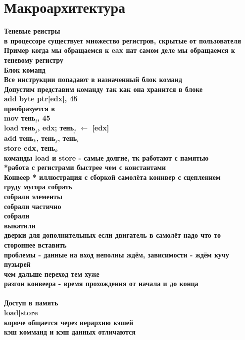 \documentclass[a4paper, 12pt]{article}
\begin{document}
\section*{Макроархитектура}
\hypertarget{macroarch}{}
\bf{Теневые реистры} \\
в процессоре существует множество регистров, скрытые от пользователя \\
Пример когда мы обращаемся к eax нат самом деле мы обращаемся к теневому регистру\\
\bf{Блок команд} \\
Все инструкции попадают в назначенный блок команд \\
Допустим представим команду так как она хранится в блоке \\
add byte ptr[edx], 45 \\
преобразуется в \\
mov тень$_i$, 45 \\
load тень$_j$, edx; тень$_j$ $\leftarrow$ [edx] \\
add тень$_k$, тень$_j$, тень$_i$ \\
store edx, тень$_k$ \\
команды load и store - самые долгие, тк работают с памятью \\
*работа с регистрами быстрее чем с константами \\
\bf{Конвеер}
* иллюстрация с сборкой самолёта коннвер с сцеплением \\
груду мусора собрать \\
собрали элементы \\
собрали частично \\
собрали \\
выкатили \\
дверки для дополнительных если двигатель в самолёт надо что то стороннее вставить \\
проблемы - данные на вход неполны ждём, зависимости - ждём кучу пузырей \\
чем дальше переход тем хуже \\

разгон конвеера - время прохождения от начала и до конца \\
\\
Доступ в память\\
load|store \\
короче общается через иерархию кэшей \\
кэш комманд и кэш данных  отличаются
\newpage
\end{document}
